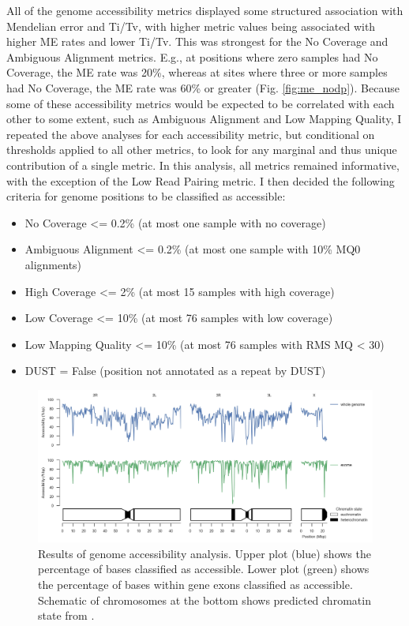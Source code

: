\documentclass[a4paper,11pt,abstracton,hidelinks]{scrartcl}
\begin{document}
All of the genome accessibility metrics displayed some structured association with Mendelian error and Ti/Tv, with higher metric values being associated with higher ME rates and lower Ti/Tv.
%
This was strongest for the No Coverage and Ambiguous Alignment metrics.
%
E.g., at positions where zero samples had No Coverage, the ME rate was 20\%, whereas at sites where three or more samples had No Coverage, the ME rate was 60\% or greater (Fig. \ref{fig:me_nodp}). 
%
Because some of these accessibility metrics would be expected to be correlated with each other to some extent, such as Ambiguous Alignment and Low Mapping Quality, I repeated the above analyses for each accessibility metric, but conditional on thresholds applied to all other metrics, to look for any marginal and thus unique contribution of a single metric.
%
In this analysis, all metrics remained informative, with the exception of the Low Read Pairing metric.
%
I then decided the following criteria for genome positions to be classified as accessible:
%
\begin{itemize}
\item No Coverage <= 0.2\% (at most one sample with no coverage)
\item Ambiguous Alignment <= 0.2\% (at most one sample with 10\% MQ0 alignments)
\item High Coverage <= 2\% (at most 15 samples with high coverage)
\item Low Coverage <= 10\% (at most 76 samples with low coverage)
\item Low Mapping Quality <= 10\% (at most 76 samples with RMS MQ < 30)
\item DUST = False (position not annotated as a repeat by DUST)
\end{itemize}


\begin{figure}[t!]
\centering
\includegraphics[width=\textwidth]{artwork/chapter3/accessibility.jpeg}
\caption{Results of genome accessibility analysis.
%
Upper plot (blue) shows the percentage of bases classified as accessible.
%
Lower plot (green) shows the percentage of bases within gene exons classified as accessible.
%
Schematic of chromosomes at the bottom shows predicted chromatin state from \citep{Sharakhova2010}.
%
}
%
\label{fig:accessibility}
\end{figure}
\end{document}

